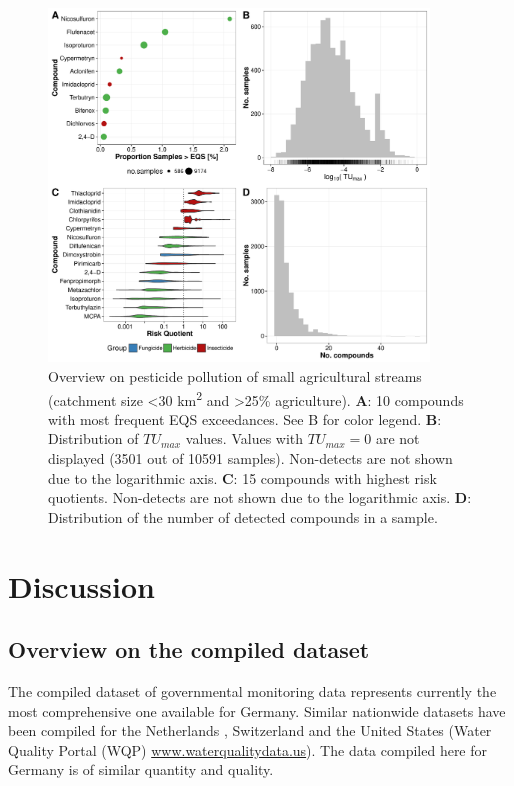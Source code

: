 \documentclass[journal=esthag,manuscript=article]{achemso}
\begin{document}
\begin{figure}[h]
  \includegraphics[width=0.9\textwidth]{figure5.pdf}
  \caption{Overview on pesticide pollution of small agricultural streams (catchment size \textless 30 km\textsuperscript{2} and \textgreater 25\% agriculture). 
      \textbf{A}: 10 compounds with most frequent EQS exceedances. See B for color legend.
      \textbf{B}: Distribution of $TU_{max}$ values. Values with $TU_{max} = 0$ are not displayed (3501 out of 10591 samples). Non-detects are not shown due to the logarithmic axis.
      \textbf{C}: 15 compounds with highest risk quotients. Non-detects are not shown due to the logarithmic axis.
      \textbf{D}: Distribution of the number of detected compounds in a sample.
  }
  \label{fig:fig5}
\end{figure}



\section{Discussion}
\subsection{Overview on the compiled dataset}
The compiled dataset of governmental monitoring data represents currently the most comprehensive one available for Germany.
Similar nationwide datasets have been compiled for the Netherlands \citep{vijver_spatial_2008}, Switzerland \citep{munz_pestizidmessungen_2011} and the United States (Water Quality Portal (WQP) \url{www.waterqualitydata.us}).
The data compiled here for Germany is of similar quantity and quality.
\end{document}
